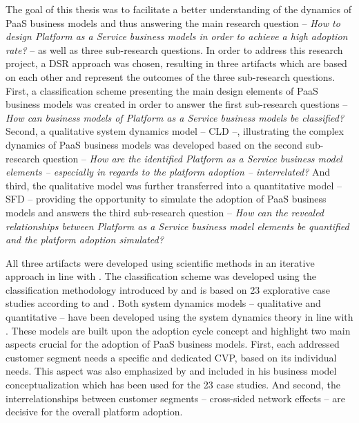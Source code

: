 The goal of this thesis was to facilitate a better understanding of the dynamics of \acf{PaaS} business models and thus answering the main research question -- \textit{How to design Platform as a Service business models in order to achieve a high adoption rate?} -- as well as three sub-research questions. In order to address this research project, a \acf{DSR} approach was chosen, resulting in three artifacts which are based on each other and represent the outcomes of the three sub-research questions. First, a classification scheme presenting the main design elements of \ac{PaaS} business models was created in order to answer the first sub-research questions -- \textit{How can business models of Platform as a Service business models be classified?} Second, a qualitative system dynamics model -- \acf{CLD} --, illustrating the complex dynamics of \ac{PaaS} business models was developed based on the second sub-research question -- \textit{How are the identified Platform as a Service business model elements -- especially in regards to the platform adoption -- interrelated?} And third, the qualitative model was further transferred into a quantitative model -- \acf{SFD} -- providing the opportunity to simulate the adoption of \ac{PaaS} business models and answers the third sub-research question -- \textit{How can the revealed relationships between Platform as a Service business model elements be quantified and the platform adoption simulated?}

All three artifacts were developed using scientific methods in an iterative approach in line with \citet{Hevner2007}. The classification scheme was developed using the classification methodology introduced by \citet{Fettke2003} and is based on 23 explorative case studies according to \citet{Eisenhardt1989} and \citet{Yin2008}. Both system dynamics models -- qualitative and quantitative -- have been developed using the system dynamics theory in line with \citet{Sterman2000,Sterman2001}. These models are built upon the adoption cycle concept \citep{Sterman2001} and highlight two main aspects crucial for the adoption of \ac{PaaS} business models. First, each addressed customer segment needs a specific and dedicated \acf{CVP}, based on its individual needs. This aspect was also emphasized by \citet{Johnson2008} and included in his business model conceptualization which has been used for the 23 case studies. And second, the interrelationships between customer segments -- cross-sided network effects -- are decisive for the overall platform adoption.

